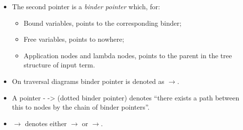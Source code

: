\documentclass[a4paper, 10pt]{article}
\begin{document}
\begin{itemize}
\begin{itemize}
  \item The second pointer is a \textit{binder pointer} which, for:
    \begin{itemize}
    \item Bound variables, points to the corresponding binder;
    \item Free variables, points to nowhere;
    \item %
    {\color{red} Application nodes and lambda nodes, points to the parent in the tree structure of input term.}
    \end{itemize}
  \item On traversal diagrams binder pointer is denoted as {\color{green}$\rightarrow$}.
  \item A pointer {\color{green} - ->} (dotted binder pointer) denotes ``there exists a path between this to nodes by the chain of binder pointers''.
  \item {\color{blue}$\rightarrow$} denotes either {\color{brown}$\rightarrow$} or {\color{violet}$\rightarrow$}.
  \end{itemize}
\end{itemize}
\end{document}
